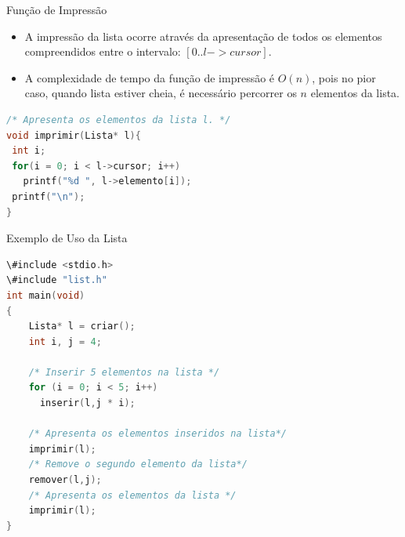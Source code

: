 \begin{frame}[fragile]{Função de Impressão}

\begin{itemize}

\item A impressão da lista ocorre através da apresentação de todos os elementos compreendidos entre o intervalo: 
  $[0 .. l->cursor]$.

\item A complexidade de tempo da função de impressão é $O(n)$, pois no 
  pior caso, quando lista estiver cheia, é necessário percorrer 
  os $n$ elementos da lista.
\end{itemize}
	
\begin{lstlisting}[language=C]
/* Apresenta os elementos da lista l. */
void imprimir(Lista* l){
 int i;
 for(i = 0; i < l->cursor; i++)
   printf("%d ", l->elemento[i]);
 printf("\n");  
}
\end{lstlisting}	
\end{frame}

\begin{frame}[fragile,c]{Exemplo de Uso da Lista}

\begin{lstlisting}[language=C]
\#include <stdio.h>
\#include "list.h"
int main(void)
{
    Lista* l = criar();
    int i, j = 4;
    
    /* Inserir 5 elementos na lista */
    for (i = 0; i < 5; i++)
      inserir(l,j * i);
    
    /* Apresenta os elementos inseridos na lista*/    
    imprimir(l);
    /* Remove o segundo elemento da lista*/
    remover(l,j);
    /* Apresenta os elementos da lista */    
    imprimir(l);        
}
\end{lstlisting}

\end{frame} 



